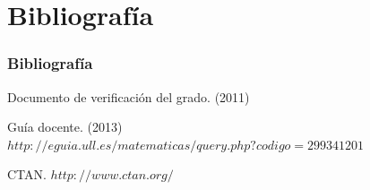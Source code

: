 \documentclass{beamer}
\begin{document}
\section{Bibliografía}
\begin{frame}
  \frametitle{Bibliografía}

  \begin{thebibliography}{10}

    \beamertemplatebookbibitems
    Documento de verificación del grado.
    (2011)

    \beamertemplatebookbibitems
    Guía docente.
    (2013)
    {\small $http://eguia.ull.es/matematicas/query.php?codigo=299341201$}

    \beamertemplatebookbibitems
    CTAN. {\small $http://www.ctan.org/$}

  \end{thebibliography}
\end{frame}

\end{document}
